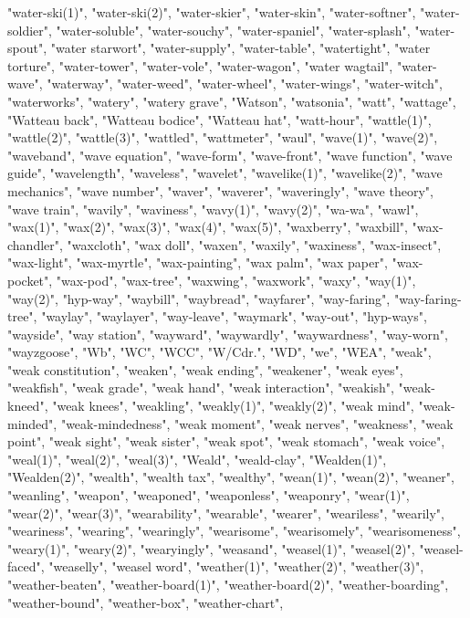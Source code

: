 "water-ski(1)",
"water-ski(2)",
"water-skier",
"water-skin",
"water-softner",
"water-soldier",
"water-soluble",
"water-souchy",
"water-spaniel",
"water-splash",
"water-spout",
"water starwort",
"water-supply",
"water-table",
"watertight",
"water torture",
"water-tower",
"water-vole",
"water-wagon",
"water wagtail",
"water-wave",
"waterway",
"water-weed",
"water-wheel",
"water-wings",
"water-witch",
"waterworks",
"watery",
"watery grave",
"Watson",
"watsonia",
"watt",
"wattage",
"Watteau back",
"Watteau bodice",
"Watteau hat",
"watt-hour",
"wattle(1)",
"wattle(2)",
"wattle(3)",
"wattled",
"wattmeter",
"waul",
"wave(1)",
"wave(2)",
"waveband",
"wave equation",
"wave-form",
"wave-front",
"wave function",
"wave guide",
"wavelength",
"waveless",
"wavelet",
"wavelike(1)",
"wavelike(2)",
"wave mechanics",
"wave number",
"waver",
"waverer",
"waveringly",
"wave theory",
"wave train",
"wavily",
"waviness",
"wavy(1)",
"wavy(2)",
"wa-wa",
"wawl",
"wax(1)",
"wax(2)",
"wax(3)",
"wax(4)",
"wax(5)",
"waxberry",
"waxbill",
"wax-chandler",
"waxcloth",
"wax doll",
"waxen",
"waxily",
"waxiness",
"wax-insect",
"wax-light",
"wax-myrtle",
"wax-painting",
"wax palm",
"wax paper",
"wax-pocket",
"wax-pod",
"wax-tree",
"waxwing",
"waxwork",
"waxy",
"way(1)",
"way(2)",
"hyp-way",
"waybill",
"waybread",
"wayfarer",
"way-faring",
"way-faring-tree",
"waylay",
"waylayer",
"way-leave",
"waymark",
"way-out",
"hyp-ways",
"wayside",
"way station",
"wayward",
"waywardly",
"waywardness",
"way-worn",
"wayzgoose",
"Wb",
"WC",
"WCC",
"W/Cdr.",
"WD",
"we",
"WEA",
"weak",
"weak constitution",
"weaken",
"weak ending",
"weakener",
"weak eyes",
"weakfish",
"weak grade",
"weak hand",
"weak interaction",
"weakish",
"weak-kneed",
"weak knees",
"weakling",
"weakly(1)",
"weakly(2)",
"weak mind",
"weak-minded",
"weak-mindedness",
"weak moment",
"weak nerves",
"weakness",
"weak point",
"weak sight",
"weak sister",
"weak spot",
"weak stomach",
"weak voice",
"weal(1)",
"weal(2)",
"weal(3)",
"Weald",
"weald-clay",
"Wealden(1)",
"Wealden(2)",
"wealth",
"wealth tax",
"wealthy",
"wean(1)",
"wean(2)",
"weaner",
"weanling",
"weapon",
"weaponed",
"weaponless",
"weaponry",
"wear(1)",
"wear(2)",
"wear(3)",
"wearability",
"wearable",
"wearer",
"weariless",
"wearily",
"weariness",
"wearing",
"wearingly",
"wearisome",
"wearisomely",
"wearisomeness",
"weary(1)",
"weary(2)",
"wearyingly",
"weasand",
"weasel(1)",
"weasel(2)",
"weasel-faced",
"weaselly",
"weasel word",
"weather(1)",
"weather(2)",
"weather(3)",
"weather-beaten",
"weather-board(1)",
"weather-board(2)",
"weather-boarding",
"weather-bound",
"weather-box",
"weather-chart",
